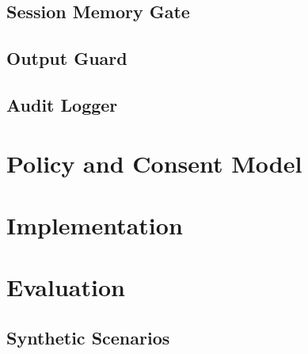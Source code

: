 \documentclass[manuscript,review,anonymous]{acmart}
\begin{document}
\subsection{Session Memory Gate}

\subsection{Output Guard}

\subsection{Audit Logger}

\section{Policy and Consent Model}

\section{Implementation}

\section{Evaluation}

\subsection{Synthetic Scenarios}
\end{document}
